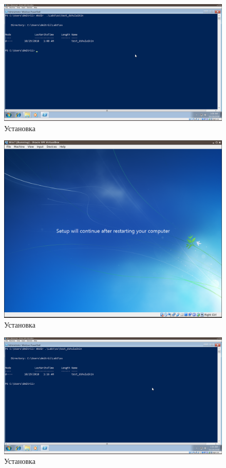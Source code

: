 \documentclass[a4paper]{article}
\begin{document}
\begin{figure}[H]
    \centering
    \includegraphics[width=\linewidth]{18.png}
    \caption{Установка}
\end{figure}


\begin{figure}[H]
    \centering
    \includegraphics[width=\linewidth]{19.png}
    \caption{Установка}
\end{figure}

\begin{figure}[H]
    \centering
    \includegraphics[width=\linewidth]{20.png}
    \caption{Установка}
\end{figure}
\end{document}
